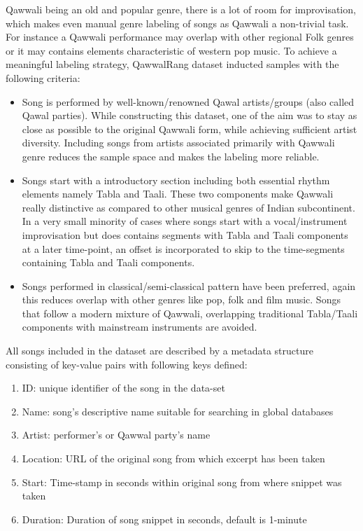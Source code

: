 \documentclass{article}
\begin{document}
Qawwali being an old and popular genre, there is a lot of room for improvisation, which makes even manual genre labeling of songs as Qawwali a non-trivial task. For instance a Qawwali performance may overlap with other regional Folk genres or it may contains elements characteristic of western pop music. To achieve a meaningful labeling strategy, QawwalRang dataset inducted samples with the following criteria:
\begin{itemize}
\item Song is performed by well-known/renowned Qawal artists/groups (also called Qawal parties). While constructing this dataset, one of the aim was to stay as close as possible to the original Qawwali form, while achieving sufficient artist diversity. Including songs from artists associated primarily with Qawwali genre reduces the sample space and makes the labeling more reliable. 
\item Songs start with a introductory section including both essential rhythm elements namely Tabla and Taali. These two components make Qawwali really distinctive as compared to other musical genres of Indian subcontinent. In a very small minority of cases where songs start with a vocal/instrument improvisation but does contains segments with Tabla and Taali components at a later time-point, an offset is incorporated to skip to the time-segments containing Tabla and Taali components.
\item Songs performed in classical/semi-classical pattern have been preferred, again this reduces overlap with other genres like pop, folk and film music. Songs that follow a modern mixture of Qawwali, overlapping traditional Tabla/Taali components with mainstream instruments are avoided.
\end{itemize}

All songs included in the dataset are described by a metadata structure consisting of key-value pairs with following keys defined:
\begin{enumerate}
\item ID: unique identifier of the song in the data-set
\item Name: song's descriptive name suitable for searching in global databases
\item Artist: performer's or Qawwal party's name
\item Location: URL of the original song from which excerpt has been taken
\item Start: Time-stamp in seconds within original song from where snippet was taken
\item Duration: Duration of song snippet in seconds, default is 1-minute
\end{enumerate}
\end{document}
